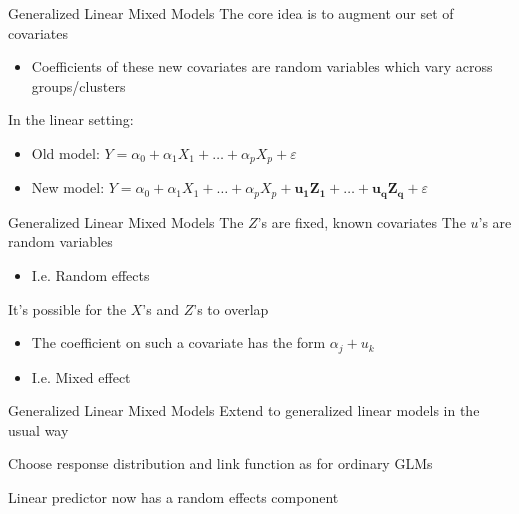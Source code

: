 \documentclass[14pt]{beamer}
\newcommand{\GLMMs}{Generalized Linear Mixed Models}
\begin{document}
\begin{frame}{Generalized Linear Mixed Models}
    The core idea is to augment our set of covariates
    \begin{itemize}
        \item Coefficients of these new covariates are random variables which vary across groups/clusters \newline
    \end{itemize}

    In the linear setting:
    \begin{itemize}
        \item Old model: $Y = \alpha_0 + \alpha_1 X_1 + \ldots + \alpha_p X_p + \varepsilon$
        \item New model: $Y = \alpha_0 + \alpha_1 X_1 + \ldots + \alpha_p X_p + \mathbf{u_1 Z_1 + \ldots + u_q Z_q} + \varepsilon$ \newline
    \end{itemize}

    


\end{frame}

\begin{frame}{\GLMMs}
    The $Z$'s are fixed, known covariates
    The $u$'s are random variables
    \begin{itemize}
        \item I.e. Random effects \newline
    \end{itemize}

    It's possible for the $X$'s and $Z$'s to overlap
    \begin{itemize}
        \item The coefficient on such a covariate has the form $\alpha_j + u_{k}$
        \item I.e. Mixed effect
    \end{itemize}

\end{frame}


\begin{frame}{\GLMMs}
    Extend to generalized linear models in the usual way \newline

    Choose response distribution and link function as for ordinary GLMs \newline

    Linear predictor now has a random effects component \newline
\end{frame}
\end{document}
